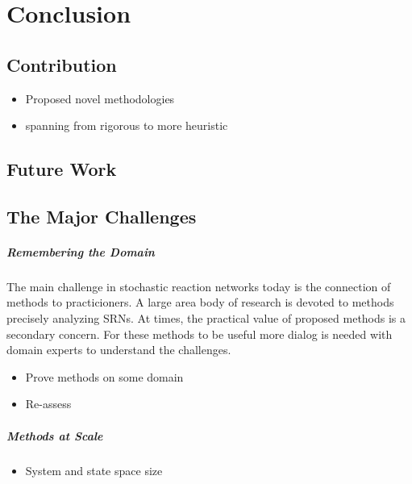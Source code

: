 \chapter{Conclusion}
\section{Contribution}
\begin{itemize}
  \item Proposed novel methodologies
  \item spanning from rigorous to more heuristic
\end{itemize}
\section{Future Work}
\section{The Major Challenges}
\paragraph{Remembering the Domain} The main challenge in stochastic reaction networks today is the connection of methods to practicioners.
A large area body of research is devoted to methods precisely analyzing \acp{SRN}.
At times, the practical value of proposed methods is a secondary concern.
For these methods to be useful more dialog is needed with domain experts to understand the challenges.
\begin{itemize}
  \item Prove methods on some domain
  \item Re-assess 
\end{itemize}

\paragraph{Methods at Scale}
\begin{itemize}
  \item System and state space size
\end{itemize}
